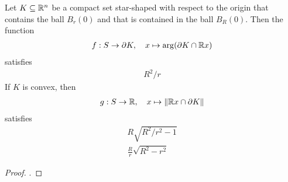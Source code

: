 \documentclass[a4paper]{article}
\begin{document}
\begin{lemma}
    Let $K \subseteq {\mathbb R}^{n}$ be a compact set star-shaped with respect to the origin 
    that contains the ball $B_{r}(0)$ and that is contained in the ball $B_{R}(0)$. Then the function 
    \begin{align*}
        f : S \rightarrow \partial K, \quad x \mapsto \arg( \partial K \cap {\mathbb R} x )
    \end{align*}
    satisfies 
    \begin{align*}
        R^{2}/r %
    \end{align*}
    If $K$ is convex, then 
    \begin{align*}
        g : S \rightarrow {\mathbb R}, \quad x \mapsto \| {\mathbb R} x \cap \partial K \|
    \end{align*}
    satisfies 
    \begin{align*}
        R \sqrt{ R^{2} / r^{2} - 1 } %
        \\
        \frac R r \sqrt{ R^{2} - r^{2} } %
    \end{align*}
\end{lemma}
\begin{proof}
    .
\end{proof}


    
    
    
    
    
    
    
    
    
    
\end{document}
